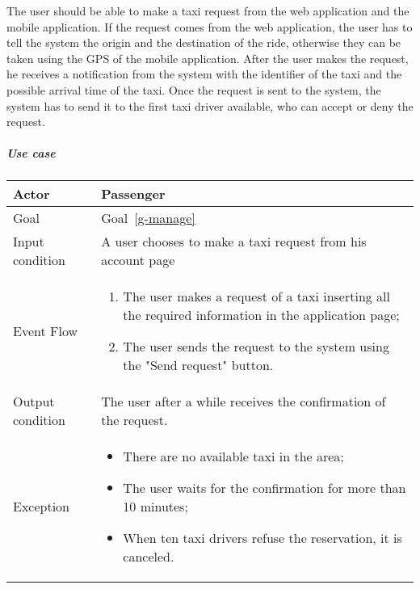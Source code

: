 The user should be able to make a taxi request from the web application and the mobile application. If the request comes from the web application, the user has to tell the system the origin and the destination of the ride, otherwise they can be taken using the GPS of the mobile application.
After the user makes the request, he receives a notification from the system with the identifier of the taxi and the possible arrival time of the taxi.
Once the request is sent to the system, the system has to send it to the first taxi driver available, who can accept or deny the request.

\subparagraph{Use case}
\noindent
    \begin{center}
        \begin{longtable}{| l | p{} |}
            \hline
            Actor & Passenger \\
            \hline
            Goal & Goal~\ref{g-manage}
            \\
            \hline
            Input condition & A user chooses to make a taxi request from his account page \\
            \hline
            Event Flow & 
                \begin{enumerate}
                	\item The user makes a request of a taxi inserting all the required information in the application page;
                	\item The user sends the request to the system using the "Send request" button.
            	\end{enumerate}
            \\
            \hline
            Output condition & The user after a while receives the confirmation of the request. \\
            \hline
            Exception & 
            \begin{itemize}
                \item There are no available taxi in the area;
                \item The user waits for the confirmation for more than 10 minutes;
                \item When ten taxi drivers refuse the reservation, it is canceled.
            \end{itemize} \\
            \hline
        \end{longtable}
    \end{center}

